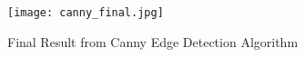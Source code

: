 \begin{figure}[!htb]
    \centering
    \texttt{[image: canny\_final.jpg]}
    \caption{Final Result from Canny Edge Detection Algorithm}
\end{figure}




%
%
%
%
